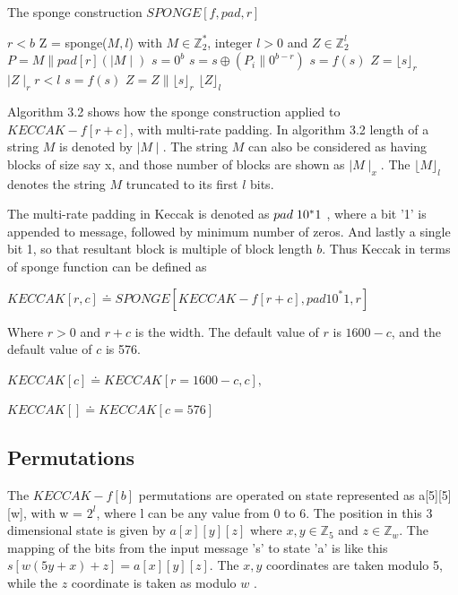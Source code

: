   \begin{algorithm}
    \caption{The sponge construction $SPONGE[f, pad, r]$ \cite{00016}}
    \begin{algorithmic}[1]
      \Require $r < b$
       Z = sponge($M, l$) with $M \in \mathbb{Z}^{*}_{2}$, integer $ l > 0$ and $Z \in \mathbb{Z}^{l}_{2}$
      \State $P = M \parallel pad[r](\mid M \mid)$
      \State $s = 0^{b}$
      \State {}
        \State $s = s \oplus ( P_{i} \parallel 0^{b - r})$
        \State $s = f(s)$
      \State \EndFor
      \State $ Z = \lfloor s \rfloor_{r}$
      \State \While $\mid Z \mid_{r} r < l $
        \State $s = f(s)$
        \State $Z = Z \parallel \lfloor s \rfloor_{r}$
      \State \EndWhile
      \State \Return $\lfloor Z \rfloor_{l}$ 
    \end{algorithmic}
  \end{algorithm}

  Algorithm 3.2 shows how the sponge construction applied to $KECCAK-f[r + c]$, with multi-rate padding. In algorithm 3.2
  length of a string $M$ is denoted by $\mid M \mid $. The string $M$ can also be considered as having blocks of size say x,
  and those number of blocks are shown as $\mid M \mid_{x}$. The $\lfloor M \rfloor_{l}$ denotes the string $M$ truncated to its first $l$ bits.
  
  The multi-rate padding in Keccak is denoted as $pad \thickspace 1 0^{*}1$ , where a bit '1' is appended to message, followed 
  by minimum number of zeros. And lastly a single bit 1, so that resultant block is multiple of block length $b$. Thus 
  Keccak in terms of sponge function can be defined as 
  \begin{center}$KECCAK[r, c] \doteq SPONGE[KECCAK-f[r + c], pad1 0^{*}1, r]$ \end{center}
  Where $ r > 0$ and $r + c$ is the width. The default value of $r$ is $1600 - c$, and the default value of $c$ is 576.
  \begin{center}$KECCAK[c] \doteq KECCAK[r = 1600 - c, c],$\end{center}
  \begin{center}$KECCAK[] \doteq KECCAK[c = 576]$\end{center}
    
  \subsection{Permutations}

  The $KECCAK-f[b]$ permutations are operated on state represented as a[5][5][w], with w = $2^{l}$, where l can be any value
  from 0 to 6. The position in this 3 dimensional state is given by $a[x][y][z]$ where $x, y \in \mathbb{Z}_{5}$ and $z \in 
  \mathbb{Z}_{w}$. The mapping of the bits from the input message 's' to state 'a' is like this $s[w (5y + x) + z] = a[x][y][z]$.
  The $x, y$ coordinates are taken modulo 5, while the $z$ coordinate is taken as modulo $w$ \cite{00015}.


